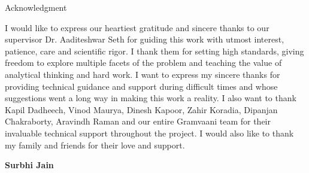 \begin{center}
\LARGE{Acknowledgment} 
\end{center}

\vspace{0.5in}

I would like to express our heartiest gratitude and sincere thanks to our supervisor Dr. Aaditeshwar Seth for guiding this work with utmost interest, patience, care and scientific rigor. I thank them for setting high standards, giving freedom to explore multiple facets of the problem and teaching the value of analytical thinking and hard work. I want to express my sincere thanks for providing technical guidance and support during difficult times and whose suggestions went a long way in making this work a
reality. I also want to thank Kapil Dadheech, Vinod Maurya, Dinesh Kapoor, Zahir Koradia, Dipanjan Chakraborty, Aravindh Raman and our entire Gramvaani team for their invaluable technical support throughout the project. I would also like to thank my family and friends for their love and support.


\vspace{1.5in}

{\bfseries Surbhi Jain}
\ \\

